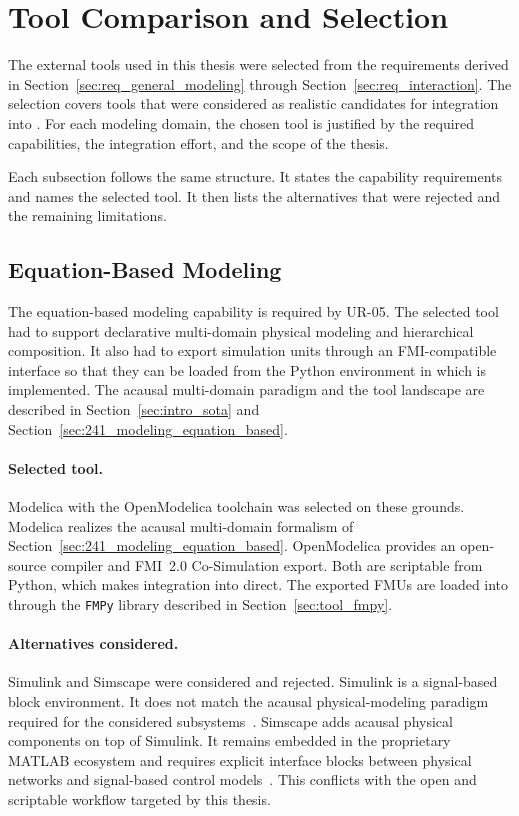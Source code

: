 \section{Tool Comparison and Selection}
\label{sec:tool_selection}

The external tools used in this thesis were selected from the requirements derived in Section~\ref{sec:req_general_modeling} through Section~\ref{sec:req_interaction}.
The selection covers tools that were considered as realistic candidates for integration into \syssimx{}.
For each modeling domain, the chosen tool is justified by the required capabilities, the integration effort, and the scope of the thesis.

Each subsection follows the same structure.
It states the capability requirements and names the selected tool.
It then lists the alternatives that were rejected and the remaining limitations.

\subsection{Equation-Based Modeling}
\label{sec:tool_equation_based}

The equation-based modeling capability is required by UR-05.
The selected tool had to support declarative multi-domain physical modeling and hierarchical composition.
It also had to export simulation units through an \ac{FMI}-compatible interface so that they can be loaded from the Python environment in which \syssimx{} is implemented.
The acausal multi-domain paradigm and the tool landscape are described in Section~\ref{sec:intro_sota} and Section~\ref{sec:241_modeling_equation_based}.

\paragraph{Selected tool.}
Modelica with the OpenModelica toolchain was selected on these grounds.
Modelica realizes the acausal multi-domain formalism of Section~\ref{sec:241_modeling_equation_based}.
OpenModelica provides an open-source compiler and \ac{FMI}~2.0 Co-Simulation export.
Both are scriptable from Python, which makes integration into \syssimx{} direct.
The exported \acp{FMU} are loaded into \syssimx{} through the \texttt{FMPy} library described in Section~\ref{sec:tool_fmpy}.

\paragraph{Alternatives considered.}
Simulink and Simscape were considered and rejected.
Simulink is a signal-based block environment.
It does not match the acausal physical-modeling paradigm required for the considered subsystems~\cite{the_mathworks_inc_simulink_2026}.
Simscape adds acausal physical components on top of Simulink.
It remains embedded in the proprietary MATLAB ecosystem and requires explicit interface blocks between physical networks and signal-based control models~\cite{the_mathworks_inc_basic_2026}.
This conflicts with the open and scriptable workflow targeted by this thesis.

